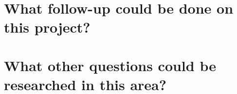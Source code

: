 \section{What follow-up could be done on this project?}

\section{What other questions could be researched in this area?}
